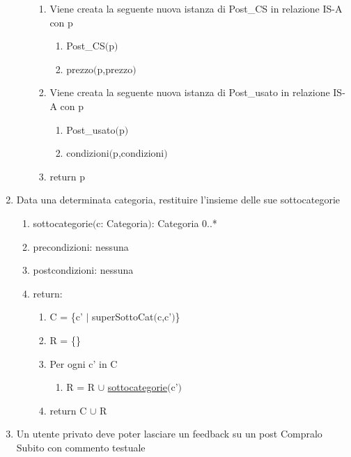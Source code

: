 \documentclass{article}
\begin{document}
\begin{enumerate}
\begin{enumerate}
\begin{enumerate}
            \item Viene creata la seguente nuova istanza di Post\_CS in relazione IS-A con p
            \begin{enumerate}
                \item Post\_CS$($p$)$
                \item prezzo$($p,prezzo$)$
            \end{enumerate}
            \item Viene creata la seguente nuova istanza di Post\_usato in relazione IS-A con p
            \begin{enumerate}
                \item Post\_usato$($p$)$
                \item condizioni$($p,condizioni$)$
            \end{enumerate}
            \item return p
        \end{enumerate}
    \end{enumerate}
    \newpage
    \item\label{sec:sottocategorie} Data una determinata categoria, restituire l'insieme delle sue sottocategorie
    \begin{enumerate}
        \item sottocategorie$($c: Categoria$)$: Categoria 0..*
        \item precondizioni: nessuna
        \item postcondizioni: nessuna
        \item return:
        \begin{enumerate}
            \item C = \{c' $|$ superSottoCat$($c,c'$)$\}
            \item R = \{\}
            \item Per ogni c' in C
            \begin{enumerate}
                \item R = R $\cup$ \hyperref[sec:sottocategorie]{sottocategorie}$($c'$)$
            \end{enumerate}
            \item return C $\cup$ R
        \end{enumerate}
    \end{enumerate}
    \newpage
    \item\label{sec:lasciaFeedbackCSConCommento} Un utente privato deve poter lasciare un feedback su un post Compralo Subito con commento testuale
    \begin{enumerate}

\end{enumerate}
\end{enumerate}
\end{document}
